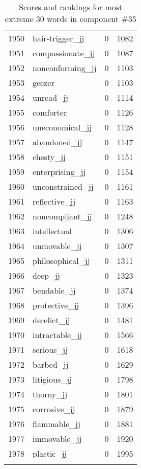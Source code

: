 \begin{longtable}[!htbp]{| rlr@{.}l |}
    1950 & hair-trigger\_jj & 0 & 1082 \\
    1951 & compassionate\_jj & 0 & 1087 \\
    1952 & nonconforming\_jj & 0 & 1103 \\
    1953 & geezer & 0 & 1103 \\
    1954 & unread\_jj & 0 & 1114 \\
    1955 & comforter & 0 & 1126 \\
    1956 & uneconomical\_jj & 0 & 1128 \\
    1957 & abandoned\_jj & 0 & 1147 \\
    1958 & chesty\_jj & 0 & 1151 \\
    1959 & enterprising\_jj & 0 & 1154 \\
    1960 & unconstrained\_jj & 0 & 1161 \\
    1961 & reflective\_jj & 0 & 1163 \\
    1962 & noncompliant\_jj & 0 & 1248 \\
    1963 & intellectual & 0 & 1306 \\
    1964 & unmovable\_jj & 0 & 1307 \\
    1965 & philosophical\_jj & 0 & 1311 \\
    1966 & deep\_jj & 0 & 1323 \\
    1967 & bendable\_jj & 0 & 1374 \\
    1968 & protective\_jj & 0 & 1396 \\
    1969 & derelict\_jj & 0 & 1481 \\
    1970 & intractable\_jj & 0 & 1566 \\
    1971 & serious\_jj & 0 & 1618 \\
    1972 & barbed\_jj & 0 & 1629 \\
    1973 & litigious\_jj & 0 & 1798 \\
    1974 & thorny\_jj & 0 & 1801 \\
    1975 & corrosive\_jj & 0 & 1879 \\
    1976 & flammable\_jj & 0 & 1881 \\
    1977 & immovable\_jj & 0 & 1920 \\
    1978 & plastic\_jj & 0 & 1995 \\
    \hline
    \caption{Scores and rankings for most extreme 30 words in component \#35} \\
\end{longtable}
